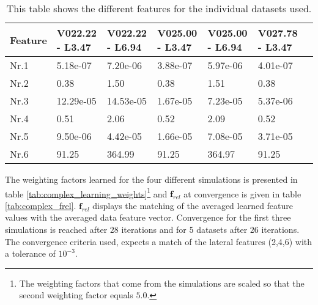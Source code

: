 \begin{table}[h!]
	\centering
	\begin{tabular}{@{}llllllr@{}} \toprule
	\textbf{Feature}     & V022.22 - L3.47 & 	V022.22 - L6.94 & V025.00 - L3.47 &	V025.00 - L6.94 & V027.78 - L3.47\\ \midrule
		Nr.1       		  &5.18e-07 &7.20e-06  	& 3.88e-07     & 5.97e-06  & 4.01e-07\\
		Nr.2              & 0.38 &1.50&	     0.38      & 1.51    &       0.38       \\
		Nr.3              & 12.29e-05&14.53e-05	& 1.67e-05 &	7.23e-05 &5.37e-06\\
		Nr.4              & 0.51 &2.06&	         0.52 &          2.09   &   0.52    \\
		Nr.5              & 9.50e-06&4.42e-05   & 1.66e-05      & 7.08e-05  & 3.71e-05       \\
		Nr.6              & 91.25 &	364.99      &	91.25	&364.97       & 91.25       \\ \bottomrule
	\end{tabular}
	\caption{This table shows the different features for the individual datasets used.}
	\label{tab:indi_features}
\end{table} 

The weighting factors learned for the four different simulations is presented in table \ref{tab:complex_learning_weights}\footnote{The weighting factors that come from the simulations are scaled so that the second weighting factor equals $5.0$.} and $\bm{f}_{rel}$ at convergence is given in table \ref{tab:complex_frel}. $\bm{f}_{rel}$ displays the matching of the averaged learned feature values with the averaged data feature vector. Convergence for the first three simulations is reached after $28$ iterations and for 5 datasets after $26$ iterations. The convergence criteria used, expects a match of the lateral features (2,4,6) with a tolerance of $10^{-3}$.\\

